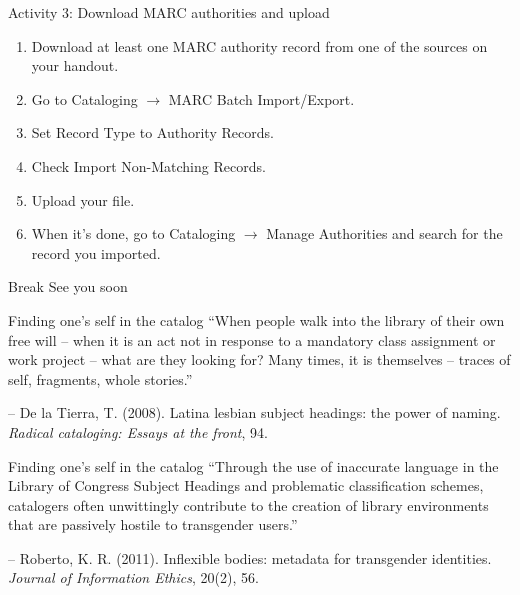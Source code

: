 \documentclass{beamer}
\begin{document}
\begin{frame}{Activity 3: Download MARC authorities and upload}
\begin{enumerate}
 \item Download at least one MARC authority record from one of the sources on your handout.
 \item Go to Cataloging $\rightarrow$ MARC Batch Import/Export.
 \item Set Record Type to Authority Records.
 \item Check Import Non-Matching Records.
 \item Upload your file.
 \item When it's done, go to Cataloging $\rightarrow$ Manage Authorities and search for the record you imported.
\end{enumerate}
\end{frame}

\begin{frame}{Break}
See you soon
\end{frame}





\begin{frame}{Finding one's self in the catalog}
``When people walk into the library of their own free will -- when it is an act not in response to a mandatory class assignment or work project -- what are they looking for? Many times, it is themselves -- traces of self, fragments, whole stories.''
\vfill

-- De la Tierra, T. (2008). Latina lesbian subject headings: the power of naming. \emph{Radical cataloging: Essays at the front}, 94.
\end{frame}


\begin{frame}{Finding one's self in the catalog}
``Through the use of inaccurate language in the 
Library of
Congress Subject Headings
 and 
problematic classification schemes, catalogers often unwittingly contribute to the creation of 
library environments that are passively hostile to transgender users.''
\vfill

-- Roberto, K. R. (2011). Inflexible bodies: metadata for transgender identities. \emph{Journal of Information Ethics}, 20(2), 56.
\end{frame}
\end{document}
